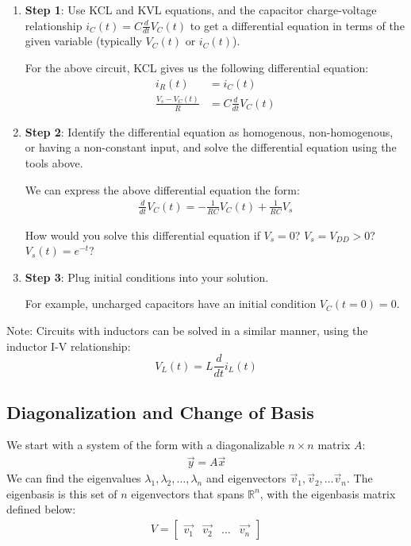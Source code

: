 \begin{enumerate}
    \item \textbf{Step 1}: Use KCL and KVL equations, and the capacitor charge-voltage relationship $i_C(t) = C \frac{d}{dt} V_C(t)$ to get a differential equation in terms of the given variable (typically $V_C(t)$ or $i_C(t)$).
    
    For the above circuit, KCL gives us the following differential equation:
    \begin{align*}
        i_R(t) &= i_C(t) \\
        \frac{V_s - V_C(t)}{R} &= C \frac{d}{dt} V_C(t)
    \end{align*}

    \item \textbf{Step 2}: Identify the differential equation as homogenous, non-homogenous, or having a non-constant input, and solve the differential equation using the tools above.

    We can express the above differential equation the form:
    \begin{align*}
        \frac{d}{dt} V_C(t) = -\frac{1}{RC} V_C(t) + \frac{1}{RC} V_s
    \end{align*}

    How would you solve this differential equation if $V_s = 0$? $V_s = V_{DD} > 0$? $V_s(t) = e^{-t}$?

    \item \textbf{Step 3}: Plug initial conditions into your solution.

    For example, uncharged capacitors have an initial condition $V_C(t = 0) = 0$.
\end{enumerate}

Note: Circuits with inductors can be solved in a similar manner, using the inductor I-V relationship: 
$$\boxed{V_L(t) = L \frac{d}{dt} i_L(t)}$$

\subsection*{Diagonalization and Change of Basis}

We start with a system of the form with a diagonalizable $n \times n$ matrix $A$:
\begin{align*}
    \vec{y} = A \vec{x}
\end{align*}
We can find the eigenvalues $\lambda_1, \lambda_2, \ldots, \lambda_n$ and eigenvectors $\vec{v}_1, \vec{v}_2, \ldots \vec{v}_n$. The eigenbasis is this set of $n$ eigenvectors that spans $\mathbb{R}^n$, with the eigenbasis matrix defined below:
\begin{align*}
    V = \begin{bmatrix}
        \vec{v_1} & \vec{v_2} & \dots & \vec{v_n}
    \end{bmatrix}
\end{align*}

